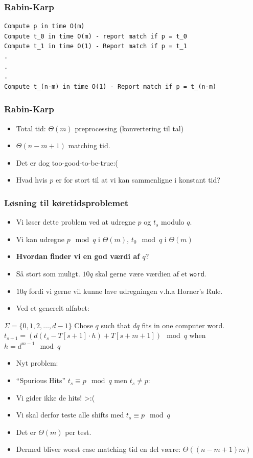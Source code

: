 \documentclass{beamer}
\begin{document}
\begin{frame}[fragile]
  \frametitle{Rabin-Karp}
  \begin{verbatim}
Compute p in time O(m)
Compute t_0 in time O(m) - report match if p = t_0
Compute t_1 in time O(1) - Report match if p = t_1
.
.
.
Compute t_(n-m) in time O(1) - Report match if p = t_(n-m)
\end{verbatim}
\end{frame}

\begin{frame}[allowframebreaks]
  \frametitle{Rabin-Karp}
 \begin{itemize}
 \item Total tid: $\Theta(m)$ preprocessing (konvertering til tal)
 \item $\Theta(n-m+1)$ matching tid.
 \item Det er dog too-good-to-be-true:(
 \item Hvad hvis $p$ er for stort til at vi kan sammenligne i konstant tid?
 \end{itemize} 
\end{frame}

\begin{frame}[allowframebreaks]
  \frametitle{Løsning til køretidsproblemet}
  \begin{itemize}
  \item Vi løser dette problem ved at udregne $p$ og $t_{s}$ modulo $q$.
  \item Vi kan udregne $p \mod q$ i $\Theta(m)$, $t_{0} \mod q$ i $\Theta(m)$
  \item \textbf{Hvordan finder vi en god værdi af $q$}?
  \item Så stort som muligt. $10q$ skal gerne være værdien af et \texttt{word}.
  \item $10q$ fordi vi gerne vil kunne lave udregningen v.h.a Horner's Rule. 
  \item Ved et generelt alfabet: 
  \end{itemize}
  \begin{theorem}
    $\Sigma = \{0,1,2,\ldots, d-1\}$
    Chose $q$ such that $dq$ fits in one computer word.
    $t_{s+1} = (d(t_{s}-T[s+1] \cdot h) + T[s+m+1]) \mod q$
    when $h = d^{m-1} \mod q$
  \end{theorem}
  \begin{itemize}
  \item Nyt problem: 
  \item ``Spurious Hits'' $t_{s} \equiv p \mod q$ men $t_{s} \neq p$: 
  \item Vi gider ikke de hits! >:(
  \item Vi skal derfor teste alle shifts med $t_{s} \equiv p \mod q$
  \item Det er $\Theta(m)$ per test.
  \item Dermed bliver worst case matching tid en del værre: $\Theta((n-m+1)m)$
  \end{itemize}
\end{frame}
\end{document}
